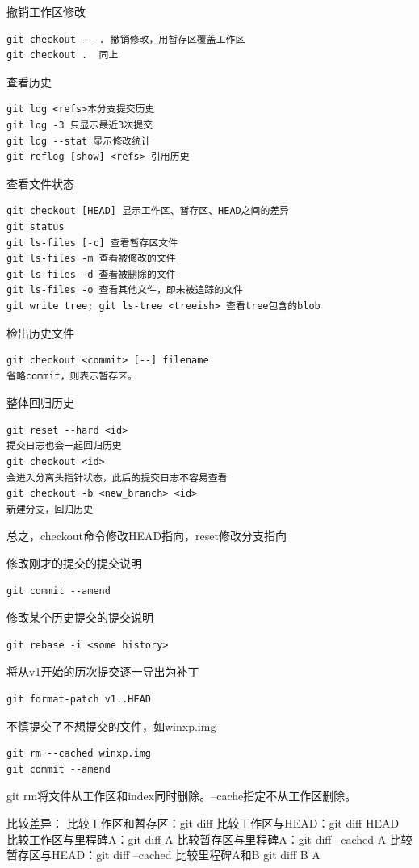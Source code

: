 撤销工作区修改
\begin{verbatim}
git checkout -- . 撤销修改，用暂存区覆盖工作区
git checkout .  同上
\end{verbatim}

查看历史
\begin{verbatim}
git log <refs>本分支提交历史
git log -3 只显示最近3次提交
git log --stat 显示修改统计
git reflog [show] <refs> 引用历史
\end{verbatim}

查看文件状态
\begin{verbatim}
git checkout [HEAD] 显示工作区、暂存区、HEAD之间的差异
git status
git ls-files [-c] 查看暂存区文件
git ls-files -m 查看被修改的文件
git ls-files -d 查看被删除的文件
git ls-files -o 查看其他文件，即未被追踪的文件
git write tree; git ls-tree <treeish> 查看tree包含的blob
\end{verbatim}

检出历史文件
\begin{verbatim}
git checkout <commit> [--] filename
省略commit，则表示暂存区。
\end{verbatim}

整体回归历史
\begin{verbatim}
git reset --hard <id> 
提交日志也会一起回归历史
git checkout <id> 
会进入分离头指针状态，此后的提交日志不容易查看
git checkout -b <new_branch> <id>
新建分支，回归历史
\end{verbatim}
总之，checkout命令修改HEAD指向，reset修改分支指向

修改刚才的提交的提交说明
\begin{verbatim}
git commit --amend
\end{verbatim}

修改某个历史提交的提交说明
\begin{verbatim}
git rebase -i <some history>
\end{verbatim}

将从v1开始的历次提交逐一导出为补丁
\begin{verbatim}
git format-patch v1..HEAD
\end{verbatim}

不慎提交了不想提交的文件，如winxp.img
\begin{verbatim}
git rm --cached winxp.img
git commit --amend
\end{verbatim}
git rm将文件从工作区和index同时删除。--cache指定不从工作区删除。

比较差异：
比较工作区和暂存区：git diff
比较工作区与HEAD：git diff HEAD
比较工作区与里程碑A：git diff A
比较暂存区与里程碑A：git diff --cached A
比较暂存区与HEAD：git diff --cached
比较里程碑A和B git diff B A

